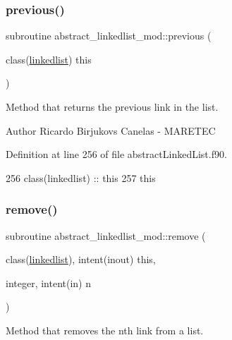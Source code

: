 \subsubsection{\texorpdfstring{previous()}{previous()}}
{\footnotesize\ttfamily subroutine abstract\+\_\+linkedlist\+\_\+mod\+::previous (\begin{DoxyParamCaption}\item[{class(\mbox{\hyperlink{structabstract__linkedlist__mod_1_1linkedlist}{linkedlist}})}]{this }\end{DoxyParamCaption})\hspace{0.3cm}{\ttfamily [private]}}



Method that returns the previous link in the list. 

\begin{DoxyAuthor}{Author}
Ricardo Birjukovs Canelas -\/ M\+A\+R\+E\+T\+EC 
\end{DoxyAuthor}


Definition at line 256 of file abstract\+Linked\+List.\+f90.


\begin{DoxyCode}
256     \textcolor{keywordtype}{class}(linkedlist) :: this
257     this%
\end{DoxyCode}
\mbox{\label{namespaceabstract__linkedlist__mod_a9f4028744d1ca6536e28c76d2795ace3}} 
\subsubsection{\texorpdfstring{remove()}{remove()}}
{\footnotesize\ttfamily subroutine abstract\+\_\+linkedlist\+\_\+mod\+::remove (\begin{DoxyParamCaption}\item[{class(\mbox{\hyperlink{structabstract__linkedlist__mod_1_1linkedlist}{linkedlist}}), intent(inout)}]{this,  }\item[{integer, intent(in)}]{n }\end{DoxyParamCaption})\hspace{0.3cm}{\ttfamily [private]}}



Method that removes the nth link from a list. 

